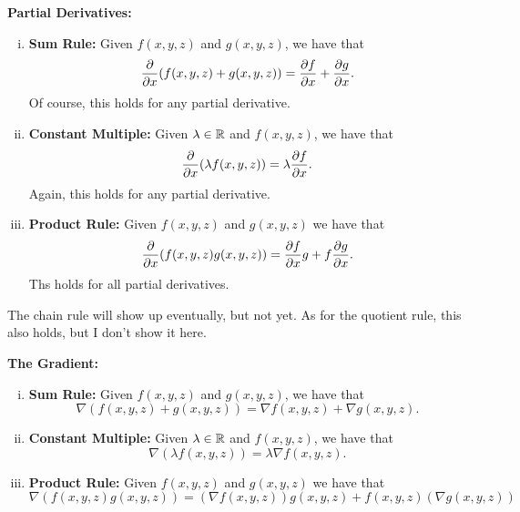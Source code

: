         \noindent\textbf{Partial Derivatives:}
        \begin{enumerate}[(i)]
            \item \textbf{Sum Rule:} Given $f(x,y,z)$ and $g(x,y,z)$, we have that
            \[
            \frac{\partial}{\partial x} (f(x,y,z)+g(x,y,z))=\frac{\partial f}{\partial x} + \frac{\partial g}{\partial x}.
            \]
            Of course, this holds for any partial derivative.
            \item \textbf{Constant Multiple:} Given $\lambda \in \mathbb{R}$ and $f(x,y,z)$, we have that
            \[
            \frac{\partial}{\partial x}(\lambda f(x,y,z))=\lambda \frac{\partial f}{\partial x}.
            \]
            Again, this holds for any partial derivative.
            \item \textbf{Product Rule:} Given $f(x,y,z)$ and $g(x,y,z)$ we have that
            \[
            \frac{\partial }{\partial x}(f(x,y,z)g(x,y,z))=\frac{\partial f}{\partial x} g + f \frac{\partial g}{\partial x}.
            \]
            Ths holds for all partial derivatives.
        \end{enumerate}
        
        \begin{remark}
        The chain rule will show up eventually, but not yet.  As for the quotient rule, this also holds, but I don't show it here.
        \end{remark}
        
        \noindent\textbf{The Gradient:}
        \begin{enumerate}[(i)]
            \item \textbf{Sum Rule:} Given $f(x,y,z)$ and $g(x,y,z)$, we have that
            \[
            \nabla(f(x,y,z)+g(x,y,z))=\nabla f(x,y,z)+\nabla g(x,y,z).
            \]
            \item \textbf{Constant Multiple:} Given $\lambda \in \mathbb{R}$ and $f(x,y,z)$, we have that
            \[
            \nabla(\lambda f(x,y,z))=\lambda \nabla f(x,y,z).
            \]
            \item \textbf{Product Rule:} Given $f(x,y,z)$ and $g(x,y,z)$ we have that
            \[
            \nabla(f(x,y,z)g(x,y,z))=(\nabla f(x,y,z))g(x,y,z)+f(x,y,z)(\nabla g(x,y,z))
            \]
            
        \end{enumerate}
        
